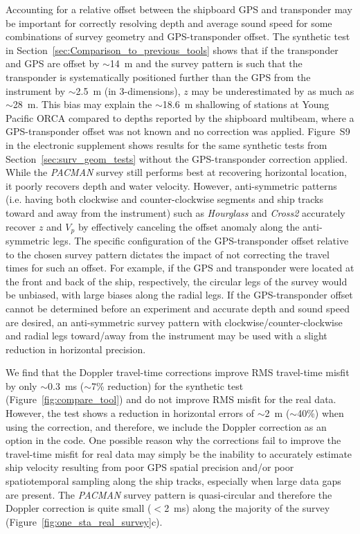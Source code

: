 Accounting for a relative offset between the shipboard GPS and transponder may be important for correctly resolving depth and average sound speed for some combinations of survey geometry and GPS-transponder offset. The synthetic test in Section~\ref{sec:Comparison_to_previous_tools} shows that if the transponder and GPS are offset by $\sim$14~m and the survey pattern is such that the transponder is systematically positioned further than the GPS from the instrument by $\sim$2.5~m (in 3-dimensions), $z$ may be underestimated by as much as $\sim$28~m. This bias may explain the $\sim$18.6~m shallowing of stations at Young Pacific ORCA compared to depths reported by the shipboard multibeam, where a GPS-transponder offset was not known and no correction was applied. Figure~S9 in the electronic supplement shows results for the same synthetic tests from Section~\ref{sec:surv_geom_tests} without the GPS-transponder correction applied. While the \textit{PACMAN} survey still performs best at recovering horizontal location, it poorly recovers depth and water velocity. However, anti-symmetric patterns (i.e. having both clockwise and counter-clockwise segments and ship tracks toward and away from the instrument) such as \textit{Hourglass} and \textit{Cross2} accurately recover $z$ and $V_p$ by effectively canceling the offset anomaly along the anti-symmetric legs. The specific configuration of the GPS-transponder offset relative to the chosen survey pattern dictates the impact of not correcting the travel times for such an offset. For example, if the GPS and transponder were located at the front and back of the ship, respectively, the circular legs of the survey would be unbiased, with large biases along the radial legs. If the GPS-transponder offset cannot be determined before an experiment and accurate depth and sound speed are desired, an anti-symmetric survey pattern with clockwise/counter-clockwise and radial legs toward/away from the instrument may be used with a slight reduction in horizontal precision.

We find that the Doppler travel-time corrections improve RMS travel-time misfit by only $\sim$0.3~ms ($\sim$7\% reduction) for the synthetic test (Figure~\ref{fig:compare_tool}) and do not improve RMS misfit for the real data. However, the test shows a reduction in horizontal errors of $\sim$2~m ($\sim$40\%) when using the correction, and therefore, we include the Doppler correction as an option in the code. One possible reason why the corrections fail to improve the travel-time misfit for real data may simply be the inability to accurately estimate ship velocity resulting from poor GPS spatial precision and/or poor spatiotemporal sampling along the ship tracks, especially when large data gaps are present. The \textit{PACMAN} survey pattern is quasi-circular and therefore the Doppler correction is quite small ($<$2~ms) along the majority of the survey (Figure~\ref{fig:one_sta_real_survey}c).

